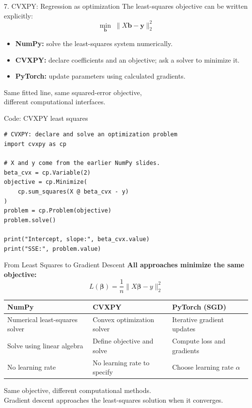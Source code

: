 \documentclass[aspectratio=43,11pt]{beamer}
\begin{document}
\begin{frame}{7. CVXPY: Regression as optimization}
\small
The least-squares objective can be written explicitly:
\[
\boxed{\min_{\mathbf b}\;\|X\mathbf b-\mathbf y\|_2^2}
\]
\begin{itemize}
\item \textbf{NumPy:} solve the least-squares system numerically.
\item \textbf{CVXPY:} declare coefficients and an objective; ask a solver to minimize it.
\item \textbf{PyTorch:} update parameters using calculated gradients.
\end{itemize}
\medskip
Same fitted line, same squared-error objective,\\different computational interfaces.
\end{frame}

\begin{frame}[fragile]{Code: CVXPY least squares}
\small
\color{maroon}
\begin{verbatim}
# CVXPY: declare and solve an optimization problem
import cvxpy as cp

# X and y come from the earlier NumPy slides.
beta_cvx = cp.Variable(2)
objective = cp.Minimize(
    cp.sum_squares(X @ beta_cvx - y)
)
problem = cp.Problem(objective)
problem.solve()

print("Intercept, slope:", beta_cvx.value)
print("SSE:", problem.value)
\end{verbatim}
\end{frame}

\begin{frame}{From Least Squares to Gradient Descent}
\small
\textbf{All approaches minimize the same objective:}
\[
L(\boldsymbol{\beta})
=\frac{1}{n}\|X\boldsymbol{\beta}-y\|_2^2
\]
\noindent
\begin{tabular}{
    >{\raggedright\arraybackslash}p{}
    >{\raggedright\arraybackslash}p{}
    >{\raggedright\arraybackslash}p{}
}
\toprule
\textbf{NumPy} & \textbf{CVXPY} & \textbf{PyTorch (SGD)} \\
\midrule
Numerical least-squares solver
& Convex optimization solver
& Iterative gradient updates \\[2pt]
Solve using linear algebra
& Define objective and solve
& Compute loss and gradients \\[2pt]
No learning rate
& No learning rate to specify
& Choose learning rate $\alpha$ \\
\bottomrule
\end{tabular}

\medskip
Same objective, different computational methods.\\
Gradient descent approaches the least-squares solution when it converges.
\end{frame}
\end{document}
